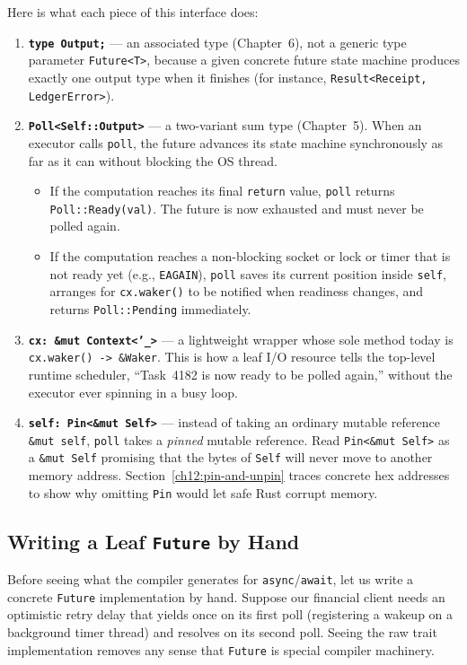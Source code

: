 Here is what each piece of this interface does:
\begin{enumerate}
  \item \textbf{\texttt{type Output;}} --- an associated type (Chapter~6), not a generic type parameter \texttt{Future<T>}, because a given concrete future state machine produces exactly one output type when it finishes (for instance, \texttt{Result<Receipt, LedgerError>}).
  \item \textbf{\texttt{Poll<Self::Output>}} --- a two-variant sum type (Chapter~5). When an executor calls \texttt{poll}, the future advances its state machine synchronously as far as it can without blocking the OS thread.
    \begin{itemize}
      \item If the computation reaches its final \texttt{return} value, \texttt{poll} returns \texttt{Poll::Ready(val)}. The future is now exhausted and must never be polled again.
      \item If the computation reaches a non-blocking socket or lock or timer that is not ready yet (e.g., \texttt{EAGAIN}), \texttt{poll} saves its current position inside \texttt{self}, arranges for \texttt{cx.waker()} to be notified when readiness changes, and returns \texttt{Poll::Pending} immediately.
    \end{itemize}
  \item \textbf{\texttt{cx: \&mut Context<'\_>}} --- a lightweight wrapper whose sole method today is \texttt{cx.waker() -> \&Waker}. This is how a leaf I/O resource tells the top-level runtime scheduler, ``Task~4182 is now ready to be polled again,'' without the executor ever spinning in a busy loop.
  \item \textbf{\texttt{self: Pin<\&mut Self>}} --- instead of taking an ordinary mutable reference \texttt{\&mut self}, \texttt{poll} takes a \emph{pinned} mutable reference. Read \texttt{Pin<\&mut Self>} as a \texttt{\&mut Self} promising that the bytes of \texttt{Self} will never move to another memory address. Section~\ref{ch12:pin-and-unpin} traces concrete hex addresses to show why omitting \texttt{Pin} would let safe Rust corrupt memory.
\end{enumerate}

\subsection{Writing a Leaf \texttt{Future} by Hand}

Before seeing what the compiler generates for \texttt{async}/\texttt{await}, let us write a concrete \texttt{Future} implementation by hand. Suppose our financial client needs an optimistic retry delay that yields once on its first poll (registering a wakeup on a background timer thread) and resolves on its second poll. Seeing the raw trait implementation removes any sense that \texttt{Future} is special compiler machinery.

